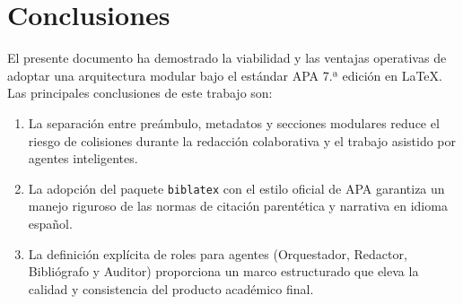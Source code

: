\section{Conclusiones}

El presente documento ha demostrado la viabilidad y las ventajas operativas de adoptar una arquitectura modular bajo el estándar APA 7.ª edición en LaTeX. Las principales conclusiones de este trabajo son:

\begin{enumerate}
    \item La separación entre preámbulo, metadatos y secciones modulares reduce el riesgo de colisiones durante la redacción colaborativa y el trabajo asistido por agentes inteligentes.
    \item La adopción del paquete \texttt{biblatex} con el estilo oficial de APA garantiza un manejo riguroso de las normas de citación parentética y narrativa en idioma español.
    \item La definición explícita de roles para agentes (Orquestador, Redactor, Bibliógrafo y Auditor) proporciona un marco estructurado que eleva la calidad y consistencia del producto académico final.
\end{enumerate}

